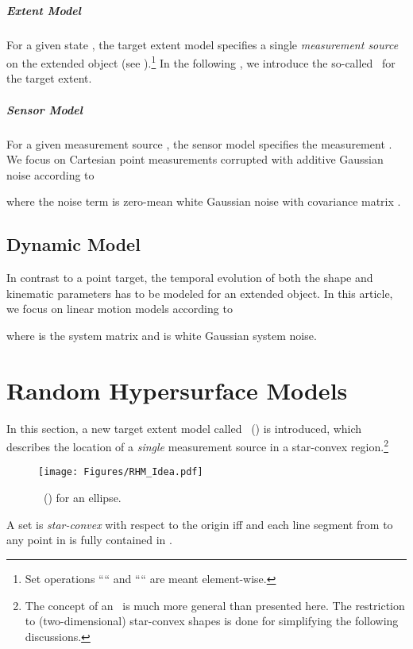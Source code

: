 \documentclass[preprint,1p,11pt]{ISAS_IR}
\newcommand{\placeFig}[1]{}
\begin{document}
\placeFig{2}

\paragraph*{Extent Model} For a given state ,  the target extent model specifies a single \emph{measurement source}    on the extended object (see ).\footnote{Set operations ```` and ```` are meant element-wise.}
 In the following  ,  we introduce the  so-called \RHM\ for the target extent.

\paragraph*{Sensor Model}
For a given  measurement source  , the sensor  model specifies the measurement .
We focus on Cartesian point measurements corrupted with additive Gaussian noise according to

where the noise term   is zero-mean  white Gaussian noise with covariance matrix .

\section{Dynamic Model}
In contrast to a point target, the temporal evolution of both the shape and kinematic parameters has to be modeled for an extended object.
 In this article,  we focus on  linear motion models according to
 
where  is the system matrix  and  is white Gaussian  system noise. \chapter{Random Hypersurface Models}
 \label{sec:rhm}
In this section, a new target extent model called \RHM\ (\rhm) is introduced, which describes the location of a \emph{single}  measurement source in a  star-convex region.\footnote{The concept of an \rhm\ is much more general than presented here. The restriction to (two-dimensional) star-convex shapes is done for simplifying the following discussions.}



\begin{figure}
\center 
\texttt{[image: Figures/RHM\_Idea.pdf]}
\caption{\RHM\ (\rhm) for an ellipse\label{fig:rhm}.}
\end{figure}
\begin{Definition}
 A set  is \emph{star-convex} with respect to the origin iff  and  each line segment   from  to any point in   is fully contained in .
\end{Definition}
\end{document}

